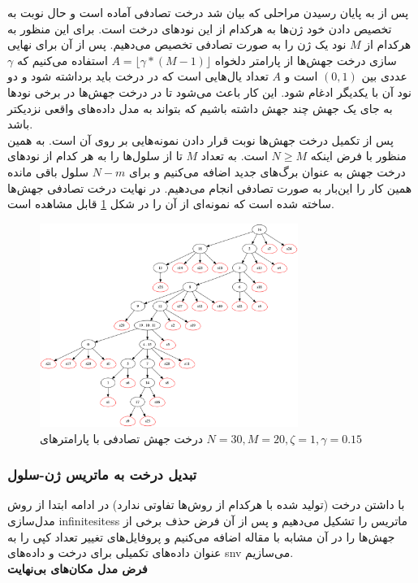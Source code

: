 پس از به پایان رسیدن مراحلی که بیان شد درخت تصادفی آماده است و حال نوبت به تخصیص دادن خود ژن‌ها به هرکدام از این نودهای درخت است. برای این منظور به هرکدام از $M$ نود یک ژن را به صورت تصادفی تخصیص می‌دهیم. پس از آن برای نهایی سازی درخت جهش‌ها از پارامتر دلخواه 	$A = \lfloor\gamma*(M-1)\rfloor$ استفاده می‌کنیم که $\gamma$ عددی بین $(0,1)$ است و $A$ تعداد یال‌هایی است که در درخت باید برداشته شود و دو نود آن با یکدیگر ادغام شود. این کار باعث می‌شود تا در درخت جهش‌ها در برخی نودها به جای یک جهش چند جهش داشته باشیم که بتواند به مدل داده‌های واقعی نزدیکتر باشد.
\\
پس از تکمیل درخت جهش‌ها نوبت قرار دادن نمونه‌هایی بر روی آن است. به همین منظور با فرض اینکه $N\ge M$ است. به تعداد $M$ تا از سلول‌ها را به هر کدام از نودهای درخت جهش به عنوان برگ‌های جدید اضافه می‌کنیم و برای $N-m$ سلول باقی مانده همین کار را این‌بار به صورت تصادفی انجام می‌دهیم. در نهایت درخت تصادفی جهش‌ها ساخته شده است که نمونه‌ای از آن را در شکل \ref{fig:mtn30m20z1g0.15} قابل مشاهده است.
\begin{figure}
	\centering
	\includegraphics[width=0.75\textwidth]{img/dataset/s/mt_N30_M20_Z1_G0.15_step3.png}
	\caption{درخت جهش تصادفی با پارامتر‌های $N=30, M=20, \zeta=1, \gamma=0.15$}
	\label{fig:mtn30m20z1g0.15}
\end{figure}

\subsubsection{تبدیل درخت به ماتریس ژن-سلول}
با داشتن درخت (تولید شده با هرکدام از روش‌ها تفاوتی ندارد) در ادامه ابتدا از روش مدل‌سازی \glspl{infinitesites} ماتریس را تشکیل می‌دهیم و پس از آن فرض حذف برخی از جهش‌ها را در آن مشابه با مقاله  اضافه می‌کنیم و پروفایل‌های تغییر تعداد کپی را به عنوان داده‌های تکمیلی برای درخت و داده‌های \gls{snv} می‌سازیم.
\vspace{20pt}
\\
\noindent\textbf{فرض مدل مکان‌های بی‌نهایت}\\


